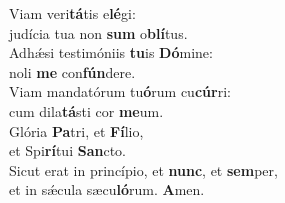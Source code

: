 \evenverse Viam veri\textbf{tá}tis e\textbf{lé}gi:~\*\\
\evenverse judícia tua non \textbf{sum} o\textbf{blí}tus.\\
\oddverse Adhǽsi testimóniis \textbf{tu}is \textbf{Dó}mine:~\*\\
\oddverse noli \textbf{me} con\textbf{fún}dere.\\
\evenverse Viam mandatórum tu\textbf{ó}rum cu\textbf{cúr}ri:~\*\\
\evenverse cum dila\textbf{tá}sti cor \textbf{me}um.\\
\oddverse Glória \textbf{Pa}tri, et \textbf{Fí}lio,~\*\\
\oddverse et Spi\textbf{rí}tui \textbf{San}cto.\\
\evenverse Sicut erat in princípio, et \textbf{nunc}, et \textbf{sem}per,~\*\\
\evenverse et in sǽcula sæcu\textbf{ló}rum. \textbf{A}men.\\
